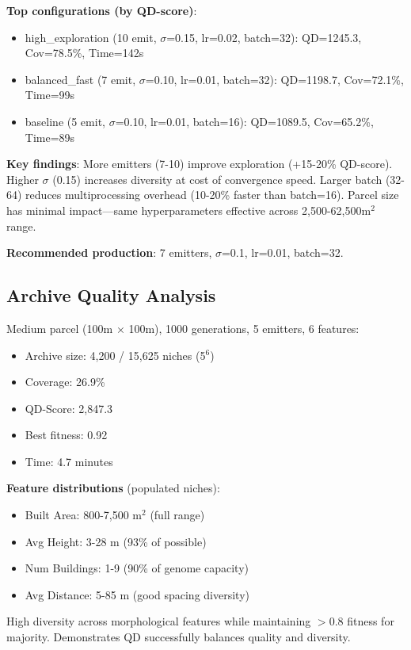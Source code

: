 \documentclass[times,final]{elsarticle}
\begin{document}
\textbf{Top configurations (by QD-score)}:
\begin{itemize}
\item high\_exploration (10 emit, $\sigma$=0.15, lr=0.02, batch=32): QD=1245.3, Cov=78.5\%, Time=142s
\item balanced\_fast (7 emit, $\sigma$=0.10, lr=0.01, batch=32): QD=1198.7, Cov=72.1\%, Time=99s
\item baseline (5 emit, $\sigma$=0.10, lr=0.01, batch=16): QD=1089.5, Cov=65.2\%, Time=89s
\end{itemize}

\textbf{Key findings}: More emitters (7-10) improve exploration (+15-20\% QD-score). Higher $\sigma$ (0.15) increases diversity at cost of convergence speed. Larger batch (32-64) reduces multiprocessing overhead (10-20\% faster than batch=16). Parcel size has minimal impact—same hyperparameters effective across 2,500-62,500m$^2$ range.

\textbf{Recommended production}: 7 emitters, $\sigma$=0.1, lr=0.01, batch=32.

\subsection{Archive Quality Analysis}

Medium parcel (100m $\times$ 100m), 1000 generations, 5 emitters, 6 features:
\begin{itemize}
\item Archive size: 4,200 / 15,625 niches (5$^6$)
\item Coverage: 26.9\%
\item QD-Score: 2,847.3
\item Best fitness: 0.92
\item Time: 4.7 minutes
\end{itemize}

\textbf{Feature distributions} (populated niches):
\begin{itemize}
\item Built Area: 800-7,500 m$^2$ (full range)
\item Avg Height: 3-28 m (93\% of possible)
\item Num Buildings: 1-9 (90\% of genome capacity)
\item Avg Distance: 5-85 m (good spacing diversity)
\end{itemize}

High diversity across morphological features while maintaining $>$0.8 fitness for majority. Demonstrates QD successfully balances quality and diversity.
\end{document}
